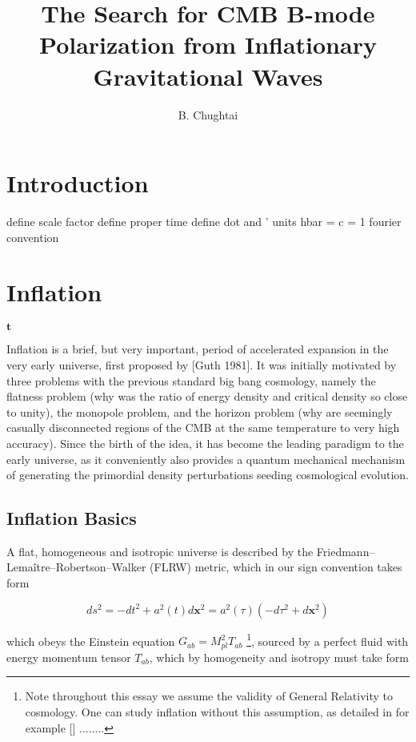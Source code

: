 \documentclass[a4paper,11pt]{article}
\title{\boldmath The Search for CMB B-mode Polarization from Inflationary Gravitational Waves}
\author{B. Chughtai}
\affiliation{University of Cambridge, Cambridge, UK}
\renewcommand{\v}[1]{\mathbf{#1}}
\newcommand{\Mp}{M_{pl}}
\begin{document}
\maketitle
\flushbottom


\section{Introduction}

define scale factor
define proper time
define dot and '
units hbar = c = 1
fourier convention

\section{Inflation}

$\v{t}$

Inflation is a brief, but very important, period of accelerated expansion in the very early universe, first proposed by [Guth 1981]. It was initially motivated by three problems with the previous standard big bang cosmology, namely the flatness problem (why was the ratio of energy density and critical density so close to unity), the monopole problem, and the horizon problem (why are seemingly casually disconnected regions of the CMB at the same temperature to very high accuracy). Since the birth of the idea, it has become the leading paradigm to the early universe, as it conveniently also provides a quantum mechanical mechanism of generating the primordial density perturbations seeding cosmological evolution.

\subsection{Inflation Basics}

A flat, homogeneous and isotropic universe is described by the Friedmann–Lemaître–Robertson–Walker (FLRW) metric, which in our sign convention takes form

\begin{equation}
\label{FLRW}
ds^2 = - dt^2 + a^2(t)d\v{x}^2 = a^2(\tau)(-d\tau^2+d\v{x}^2)
\end{equation}

which obeys the Einstein equation $G_{ab} = \Mp^2 T_{ab}$ \footnote{Note throughout this essay we assume the validity of General Relativity to cosmology. One can study inflation without this assumption, as detailed in for example [] ........}, sourced by a perfect fluid with energy momentum tensor $T_{ab}$, which by homogeneity and isotropy must take form
\end{document}
